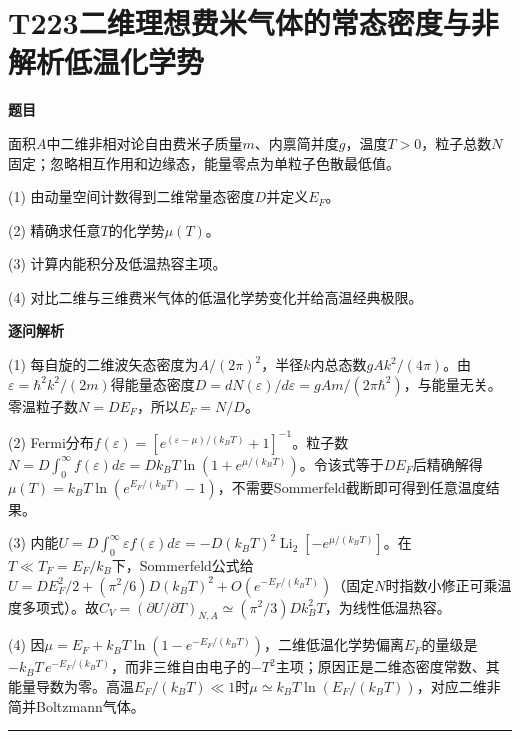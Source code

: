\documentclass[UTF8,a4paper,11pt,oneside,openany]{ctexbook}
\begin{document}
\section*{T223\quad 二维理想费米气体的常态密度与非解析低温化学势}
\textbf{题目}\par
面积$A$中二维非相对论自由费米子质量$m$、内禀简并度$g$，温度$T>0$，粒子总数$N$固定；忽略相互作用和边缘态，能量零点为单粒子色散最低值。
\par\smallskip\noindent (1) 由动量空间计数得到二维常量态密度$D$并定义$E_F$。
\par\smallskip\noindent (2) 精确求任意$T$的化学势$\mu(T)$。
\par\smallskip\noindent (3) 计算内能积分及低温热容主项。
\par\smallskip\noindent (4) 对比二维与三维费米气体的低温化学势变化并给高温经典极限。
\par\medskip\textbf{逐问解析}\par
\par\smallskip\noindent (1) 每自旋的二维波矢态密度为$A/(2\pi)^2$，半径$k$内总态数$gAk^2/(4\pi)$。由$\varepsilon=\hbar^2k^2/(2m)$得能量态密度$D=dN(\varepsilon)/d\varepsilon=gAm/(2\pi\hbar^2)$，与能量无关。零温粒子数$N=DE_F$，所以$E_F=N/D$。
\par\smallskip\noindent (2) Fermi分布$f(\varepsilon)=[e^{(\varepsilon-\mu)/(k_BT)}+1]^{-1}$。粒子数$N=D\int_0^\infty f(\varepsilon)d\varepsilon=Dk_BT\ln(1+e^{\mu/(k_BT)})$。令该式等于$DE_F$后精确解得$\mu(T)=k_BT\ln(e^{E_F/(k_BT)}-1)$，不需要Sommerfeld截断即可得到任意温度结果。
\par\smallskip\noindent (3) 内能$U=D\int_0^\infty\varepsilon f(\varepsilon)d\varepsilon=-D(k_BT)^2\operatorname{Li}_2[-e^{\mu/(k_BT)}]$。在$T\ll T_F=E_F/k_B$下，Sommerfeld公式给$U=DE_F^2/2+(\pi^2/6)D(k_BT)^2+O(e^{-E_F/(k_BT)})$（固定$N$时指数小修正可乘温度多项式）。故$C_V=(\partial U/\partial T)_{N,A}\simeq(\pi^2/3)Dk_B^2T$，为线性低温热容。
\par\smallskip\noindent (4) 因$\mu=E_F+k_BT\ln(1-e^{-E_F/(k_BT)})$，二维低温化学势偏离$E_F$的量级是$-k_BT\,e^{-E_F/(k_BT)}$，而非三维自由电子的$-T^2$主项；原因正是二维态密度常数、其能量导数为零。高温$E_F/(k_BT)\ll1$时$\mu\simeq k_BT\ln(E_F/(k_BT))$，对应二维非简并Boltzmann气体。
\par\medskip\hrule\medskip
\end{document}
